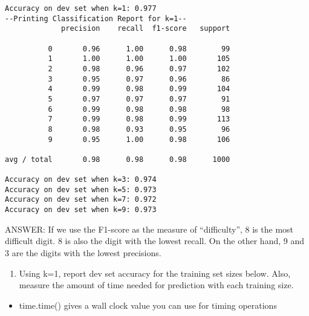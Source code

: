 \documentclass[11pt]{article}
\providecommand{\tightlist}{%
      \setlength{\itemsep}{0pt}\setlength{\parskip}{0pt}}
\begin{document}
    \begin{Verbatim}[commandchars=\\\{\}]
Accuracy on dev set when k=1: 0.977
--Printing Classification Report for k=1--
             precision    recall  f1-score   support

          0       0.96      1.00      0.98        99
          1       1.00      1.00      1.00       105
          2       0.98      0.96      0.97       102
          3       0.95      0.97      0.96        86
          4       0.99      0.98      0.99       104
          5       0.97      0.97      0.97        91
          6       0.99      0.98      0.98        98
          7       0.99      0.98      0.99       113
          8       0.98      0.93      0.95        96
          9       0.95      1.00      0.98       106

avg / total       0.98      0.98      0.98      1000

Accuracy on dev set when k=3: 0.974
Accuracy on dev set when k=5: 0.973
Accuracy on dev set when k=7: 0.972
Accuracy on dev set when k=9: 0.973

    \end{Verbatim}

    ANSWER: If we use the F1-score as the measure of ``difficulty'', 8 is
the most difficult digit. 8 is also the digit with the lowest recall. On
the other hand, 9 and 3 are the digits with the lowest precisions.

    \begin{enumerate}
\def\labelenumi{(\arabic{enumi})}
\setcounter{enumi}{2}
\tightlist
\item
  Using k=1, report dev set accuracy for the training set sizes below.
  Also, measure the amount of time needed for prediction with each
  training size.
\end{enumerate}

\begin{itemize}
\tightlist
\item
  time.time() gives a wall clock value you can use for timing operations
\end{itemize}
\end{document}
